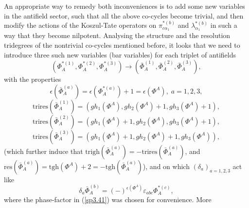 \documentclass[a4paper,12pt]{article}
\begin{document}
An appropriate way to remedy both inconveniences is to add some new
variables in the antifield sector, such that all the above co-cycles become
trivial, and then modify the actions of the Koszul-Tate operators on $\pi
_{c\alpha _{1}}^{*(b)}$ and $\lambda _{\alpha _{1}}^{*(b)}$ in such a way
that they become nilpotent. Analysing the structure and the resolution
tridegrees of the nontrivial co-cycles mentioned before, it looks that we
need to introduce three such new variables (bar variables) for each triplet
of antifields 
\begin{equation}
\left( \Phi _{A}^{*(1)},\Phi _{A}^{*(2)},\Phi _{A}^{*(3)}\right) \rightarrow
\left( \bar{\Phi}_{A}^{(1)},\bar{\Phi}_{A}^{(2)},\bar{\Phi}_{A}^{(3)}\right)
,  \label{sp3.36}
\end{equation}
with the properties 
\begin{equation}
\epsilon \left( \bar{\Phi}_{A}^{(a)}\right) =\epsilon \left( \Phi
_{A}^{*(a)}\right) +1=\epsilon \left( \Phi ^{A}\right) ,\;a=1,2,3,
\label{sp3.37}
\end{equation}
\begin{equation}
\mathrm{trires}\left( \bar{\Phi}_{A}^{(1)}\right) =\left( gh_{1}\left( \Phi
^{A}\right) ,gh_{2}\left( \Phi ^{A}\right) +1,gh_{3}\left( \Phi ^{A}\right)
+1\right) ,  \label{sp3.38}
\end{equation}
\begin{equation}
\mathrm{trires}\left( \bar{\Phi}_{A}^{(2)}\right) =\left( gh_{1}\left( \Phi
^{A}\right) +1,gh_{2}\left( \Phi ^{A}\right) ,gh_{3}\left( \Phi ^{A}\right)
+1\right) ,  \label{sp3.39}
\end{equation}
\begin{equation}
\mathrm{trires}\left( \bar{\Phi}_{A}^{(3)}\right) =\left( gh_{1}\left( \Phi
^{A}\right) +1,gh_{2}\left( \Phi ^{A}\right) +1,gh_{3}\left( \Phi
^{A}\right) \right) ,  \label{sp3.40}
\end{equation}
(which further induce that $\mathrm{trigh}\left( \bar{\Phi}_{A}^{(a)}\right)
=-\mathrm{trires}\left( \bar{\Phi}_{A}^{(a)}\right) $, and $\mathrm{res}%
\left( \bar{\Phi}_{A}^{(a)}\right) =\mathrm{tgh}\left( \Phi ^{A}\right) +2=-%
\mathrm{tgh}\left( \bar{\Phi}_{A}^{(a)}\right) $), and on which $\left(
\delta _{a}\right) _{a=1,2,3}$ act like 
\begin{equation}
\delta _{a}\bar{\Phi}_{A}^{(b)}=\left( -\right) ^{\epsilon \left( \Phi
^{A}\right) }\varepsilon _{abc}\Phi _{A}^{*(c)},  \label{sp3.41}
\end{equation}
where the phase-factor in (\ref{sp3.41}) was chosen for convenience. More
\end{document}
